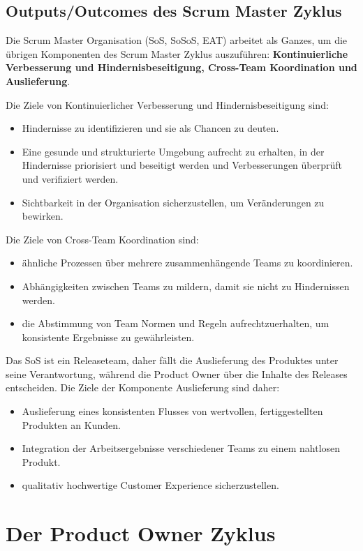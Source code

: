 \documentclass[12pt,a4paper,parskip=full]{scrartcl}
\begin{document}
\subsection{Outputs/Outcomes des Scrum Master Zyklus}
Die Scrum Master Organisation (SoS, SoSoS, EAT) arbeitet als Ganzes, um die
übrigen Komponenten des Scrum Master Zyklus auszuführen: \textbf{Kontinuierliche Verbesserung
und Hindernisbeseitigung, Cross-Team Koordination und Auslieferung}.

Die Ziele von Kontinuierlicher Verbesserung und Hindernisbeseitigung sind:
\begin{itemize}
\item Hindernisse zu identifizieren und sie als Chancen zu deuten.
\item Eine gesunde und strukturierte Umgebung aufrecht zu erhalten, in der
Hindernisse priorisiert und beseitigt werden und Verbesserungen überprüft
und verifiziert werden.
\item Sichtbarkeit in der Organisation sicherzustellen, um Veränderungen zu bewirken.
\end{itemize}
Die Ziele von Cross-Team Koordination sind:
\begin{itemize}
\item ähnliche Prozessen über mehrere zusammenhängende Teams zu koordinieren.
\item Abhängigkeiten zwischen Teams zu mildern, damit sie nicht zu Hindernissen werden.
\item die Abstimmung von Team Normen und Regeln aufrechtzuerhalten, um konsistente
Ergebnisse zu gewährleisten.
\end{itemize}

Das SoS ist ein Releaseteam, daher fällt die Auslieferung des Produktes unter
seine Verantwortung, während die Product Owner über die Inhalte des Releases
entscheiden. Die Ziele der Komponente Auslieferung sind daher:

\begin{itemize}
\item Auslieferung eines konsistenten Flusses von wertvollen, fertiggestellten Produkten an Kunden.
\item Integration der Arbeitsergebnisse verschiedener Teams zu einem nahtlosen Produkt.
\item qualitativ hochwertige Customer Experience sicherzustellen.
\end{itemize}

\section{Der Product Owner Zyklus}
\end{document}
